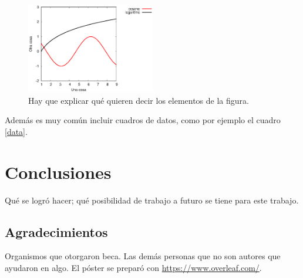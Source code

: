 \documentclass{sciposter}
\begin{document}
\begin{multicols}{2}
\begin{figure}
\setcounter{figure}{1} %
\captionsetup{type=figure} %
\begin{center}
   \includegraphics[width=0.5\textwidth]{curvas.eps}
   \end{center}
    \caption{Hay que explicar qué quieren decir los elementos de la figura.}
    \label{curvas}
\end{figure}

Además es muy común incluir cuadros de datos, como por ejemplo el cuadro \ref{data}.

\begin{table}
\setcounter{table}{0} %
\captionsetup{type=table} %
\caption{Aquí explicas cómo interpreta el cuadro.}
\label{data}
\begin{center}
\end{center}
\end{table}

\section{Conclusiones}

Qué se logró hacer; qué posibilidad de trabajo a futuro se tiene para este trabajo.

\subsection*{Agradecimientos}

Organismos que otorgaron beca. Las demás personas que no son autores que ayudaron en algo. El póster se preparó con \url{https://www.overleaf.com/}.

\end{multicols}



\end{document}
